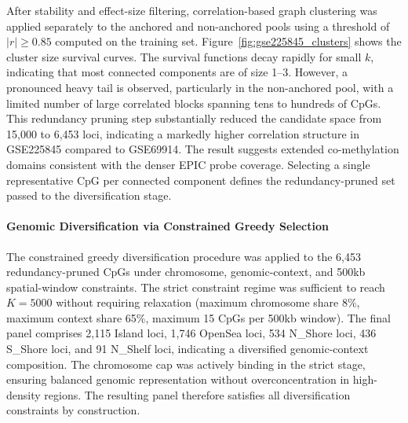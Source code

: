 After stability and effect-size filtering, correlation-based 
graph clustering was applied separately to the anchored 
and non-anchored pools using a threshold of $|r| \ge 0.85$ 
computed on the training set. 
Figure~\ref{fig:gse225845_clusters} shows the cluster size 
survival curves.
The survival functions decay rapidly for small $k$, indicating 
that most connected components are of size 1--3. However, 
a pronounced heavy tail is observed, particularly in the 
non-anchored pool, with a limited number of large correlated 
blocks spanning tens to hundreds of CpGs.
This redundancy pruning step substantially reduced the 
candidate space from 15{,}000 to 6{,}453 loci, indicating 
a markedly higher correlation structure in GSE225845 
compared to GSE69914. The result suggests extended 
co-methylation domains consistent with the denser EPIC 
probe coverage.
Selecting a single representative CpG per connected component 
defines the redundancy-pruned set passed to the 
diversification stage.

\paragraph{Genomic Diversification via Constrained Greedy Selection}

The constrained greedy diversification procedure was applied 
to the 6{,}453 redundancy-pruned CpGs under chromosome, 
genomic-context, and 500kb spatial-window constraints. 
The strict constraint regime was sufficient to reach 
$K=5000$ without requiring relaxation 
(maximum chromosome share 8\%, maximum context share 65\%, 
maximum 15 CpGs per 500kb window).
The final panel comprises 2{,}115 Island loci, 1{,}746 OpenSea loci, 
534 N\_Shore loci, 436 S\_Shore loci, and 91 N\_Shelf loci, 
indicating a diversified genomic-context composition. 
The chromosome cap was actively binding in the strict stage, 
ensuring balanced genomic representation without overconcentration 
in high-density regions.
The resulting panel therefore satisfies all diversification 
constraints by construction.

